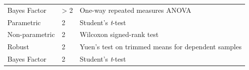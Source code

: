 \documentclass[
]{article}
\begin{document}
\begin{longtable}[]{@{}lll@{}}
\begin{minipage}[t]{0.26\columnwidth}\raggedright
Bayes Factor\strut
\end{minipage} & \begin{minipage}[t]{0.07\columnwidth}\raggedright
\textgreater{} 2\strut
\end{minipage} & \begin{minipage}[t]{0.59\columnwidth}\raggedright
One-way repeated measures ANOVA\strut
\end{minipage}\tabularnewline
\begin{minipage}[t]{0.26\columnwidth}\raggedright
Parametric\strut
\end{minipage} & \begin{minipage}[t]{0.07\columnwidth}\raggedright
2\strut
\end{minipage} & \begin{minipage}[t]{0.59\columnwidth}\raggedright
Student's \emph{t}-test\strut
\end{minipage}\tabularnewline
\begin{minipage}[t]{0.26\columnwidth}\raggedright
Non-parametric\strut
\end{minipage} & \begin{minipage}[t]{0.07\columnwidth}\raggedright
2\strut
\end{minipage} & \begin{minipage}[t]{0.59\columnwidth}\raggedright
Wilcoxon signed-rank test\strut
\end{minipage}\tabularnewline
\begin{minipage}[t]{0.26\columnwidth}\raggedright
Robust\strut
\end{minipage} & \begin{minipage}[t]{0.07\columnwidth}\raggedright
2\strut
\end{minipage} & \begin{minipage}[t]{0.59\columnwidth}\raggedright
Yuen's test on trimmed means for dependent samples\strut
\end{minipage}\tabularnewline
\begin{minipage}[t]{0.26\columnwidth}\raggedright
Bayes Factor\strut
\end{minipage} & \begin{minipage}[t]{0.07\columnwidth}\raggedright
2\strut
\end{minipage} & \begin{minipage}[t]{0.59\columnwidth}\raggedright
Student's \emph{t}-test\strut
\end{minipage}\tabularnewline
\bottomrule
\end{longtable}
\end{document}

